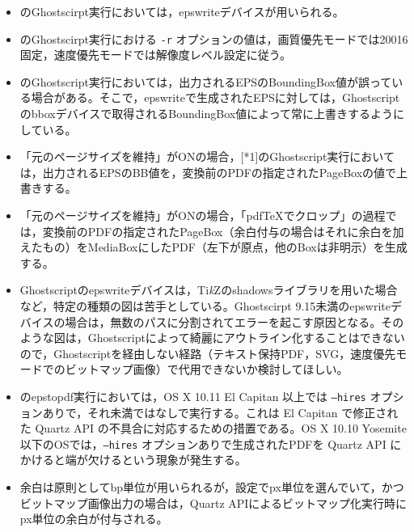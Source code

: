 \documentclass[uplatex,dvipdfmx,landscape]{jsarticle}
\newcommand*\TikZ{Ti\textit{k}Z}
\begin{document}

{\baselineskip18pt
\begin{itemize}[leftmargin=2zw]
\item\relax[*1]のGhostscirpt実行においては，epswriteデバイスが用いられる。
\item\relax[*1]のGhostscirpt実行における \texttt{-r} オプションの値は，画質優先モードでは20016固定，速度優先モードでは解像度レベル設定に従う。
\item\relax[*1]のGhostscript実行においては，出力されるEPSのBoundingBox値が誤っている場合がある。そこで，epswriteで生成されたEPSに対しては，Ghostscriptのbboxデバイスで取得されるBoundingBox値によって常に上書きするようにしている。
\item 「元のページサイズを維持」がONの場合，[*1]のGhostscript実行においては，出力されるEPSのBB値を，変換前のPDFの指定されたPageBoxの値で上書きする。
\item 「元のページサイズを維持」がONの場合，「pdf\TeX でクロップ」の過程では，変換前のPDFの指定されたPageBox（余白付与の場合はそれに余白を加えたもの）をMediaBoxにしたPDF（左下が原点，他のBoxは非明示）を生成する。
\item Ghostscriptのepswriteデバイスは，\TikZ のshadowsライブラリを用いた場合など，特定の種類の図は苦手としている。Ghostscirpt 9.15未満のepswriteデバイスの場合は，無数のパスに分割されてエラーを起こす原因となる。そのような図は，Ghostscriptによって綺麗にアウトライン化することはできないので，Ghostscriptを経由しない経路（テキスト保持PDF，SVG，速度優先モードでのビットマップ画像）で代用できないか検討してほしい。
\item\relax[*2]のepstopdf実行においては，OS X 10.11 El Capitan 以上では \texttt{--hires} オプションありで，それ未満ではなしで実行する。これは El Capitan で修正された Quartz API の不具合に対応するための措置である。OS X 10.10 Yosemite 以下のOSでは，\texttt{--hires} オプションありで生成されたPDFを Quartz API にかけると端が欠けるという現象が発生する。
\item 余白は原則としてbp単位が用いられるが，設定でpx単位を選んでいて，かつビットマップ画像出力の場合は，Quartz APIによるビットマップ化実行時にpx単位の余白が付与される。
\end{itemize}
}
\end{document}
